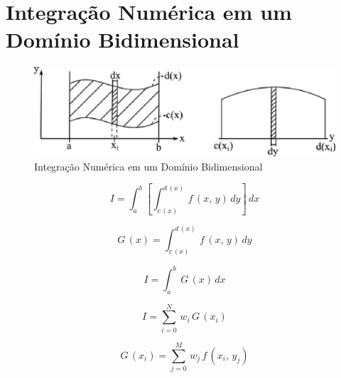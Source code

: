 \section{Integração Numérica em um Domínio Bidimensional}

\begin{figure}[htb]
 \centering
 \includegraphics[scale=1.0]{capitulos/capitulo2/figuras/int_num_dom_bid1.eps}
 \caption{Integração Numérica em um Domínio Bidimensional}
 \label{fig:int_num_dom_bid1}
\end{figure}

\begin{equation}
 \label{cap2:sec9:eq1}
 I = \int_a^b \left[ \int_{c\,(x)}^{d\,(x)} \, f\,(x,\,y) \, dy \right] \, dx
\end{equation}

\begin{equation}
 \label{cap2:sec9:eq2}
 G\,(x) = \int_{c\,(x)}^{d\,(x)} \, f\,(x,\,y) \, dy
\end{equation}

\begin{equation}
 \label{cap2:sec9:eq3}
 I = \int_a^b \, G\,(x) \, dx
\end{equation}

\begin{equation}
 \label{cap2:sec9:eq4}
 I = \sum_{i = 0}^N \, w_i \, G\,(x_i)
\end{equation}

\begin{equation}
 \label{cap2:sec9:eq5}
 G\,(x_i) = \sum_{j = 0}^M \, w_j \, f\,(x_i,\,y_j)
\end{equation}

